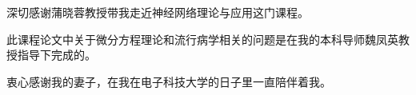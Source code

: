 \begin{acknowledgement}

	深切感谢蒲晓蓉教授带我走近神经网络理论与应用这门课程。

	此课程论文中关于微分方程理论和流行病学相关的问题是在我的本科导师魏凤英教授指导下完成的。

	衷心感谢我的妻子，在我在电子科技大学的日子里一直陪伴着我。
\end{acknowledgement}